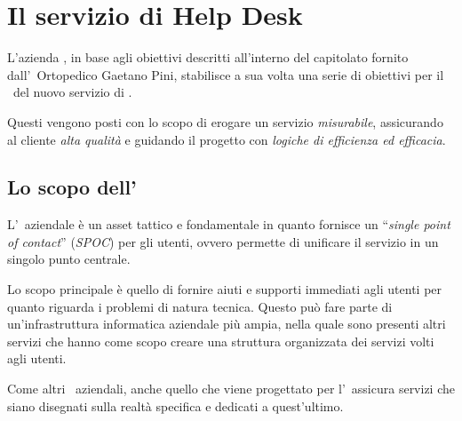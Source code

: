 \chapter{Il servizio di Help Desk}\label{ch:servizio_helpdesk}

	L'azienda \azienda, in base agli obiettivi descritti all'interno del capitolato fornito dall'\istituto~Ortopedico Gaetano Pini, stabilisce a sua volta una serie di obiettivi per il \rollout~del nuovo servizio di \helpdesk.
	
	Questi vengono posti con lo scopo di erogare un servizio \textit{misurabile}, assicurando al cliente \textit{alta qualità} e guidando il progetto con \textit{logiche di efficienza ed efficacia}.
	
\section{Lo scopo dell'\helpdesk}\label{sec:scopo_helpdesk}
	
	L'\helpdesk~aziendale è un asset tattico e fondamentale in quanto fornisce un ``\textit{single point of contact}'' (\textit{SPOC}) per gli utenti, ovvero permette di unificare il servizio in un singolo punto centrale.

	Lo scopo principale è quello di fornire aiuti e supporti immediati agli utenti per quanto riguarda i problemi di natura tecnica.
	Questo può fare parte di un'infrastruttura informatica aziendale più ampia, nella quale sono presenti altri servizi che hanno come scopo creare una struttura organizzata dei servizi volti agli utenti.
	
	Come altri \helpdesk~aziendali, anche quello che viene progettato per l'\istituto~assicura servizi che siano disegnati sulla realtà specifica e dedicati a quest'ultimo.
	
